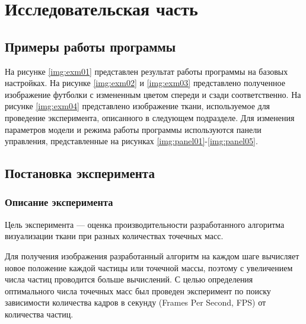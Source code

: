 \chapter{Исследовательская часть}

\section{Примеры работы программы}

На рисунке \ref{img:exm01} представлен результат работы программы на
базовых настройках. На рисунке \ref{img:exm02} и \ref{img:exm03}
представлено полученное изображение футболки с измененным цветом спереди и
сзади соответственно. На рисунке \ref{img:exm04} представлено изображение
ткани, используемое для проведение эксперимента, описанного в
следующем подразделе.
Для изменения параметров модели и режима работы программы используются панели
управления, представленные на рисунках \ref{img:panel01}-\ref{img:panel05}.








\section{Постановка эксперимента}

\subsection{Описание эксперимента}

Цель эксперимента --- оценка производительности разработанного
алгоритма визуализации ткани при разных количествах точечных масс.

Для получения изображения разработанный алгоритм на каждом шаге вычисляет новое
положение каждой частицы или точечной массы, поэтому с увеличением числа частиц
проводится больше вычислений. С целью определения оптимального числа точечных
масс был проведен эксперимент по поиску зависимости количества кадров в секунду
(Frames Per Second, FPS) от количества частиц.

